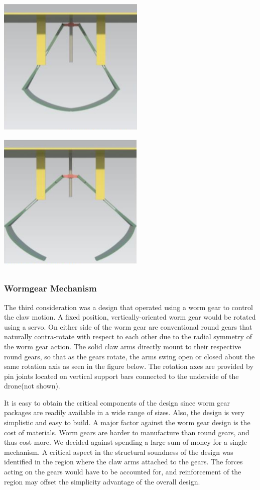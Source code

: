 			\includegraphics[width = 7cm, height = 7cm]{img/PL/slide2.PNG}
			\includegraphics[width = 7cm, height = 7cm]{img/PL/slide1.PNG}

		\subsubsection{Wormgear Mechanism}
			The third consideration was a design that operated using a worm gear to control the claw motion. A fixed position, vertically-oriented worm gear would be rotated using a servo. On either side of the worm gear are conventional round gears that naturally contra-rotate with respect to each other due to the radial symmetry of the worm gear action. The solid claw arms directly mount to their respective round gears, so that as the gears rotate, the arms swing open or closed about the same rotation axis as seen in the figure below. The rotation axes are provided by pin joints located on vertical support bars connected to the underside of the drone(not shown).

			It is easy to obtain the critical components of the design since worm gear packages are readily available in a wide range of sizes. Also, the design is very simplistic and easy to build. A major factor against the worm gear design is the cost of materials. Worm gears are harder to manufacture than round gears, and thus cost more. We decided against spending a large sum of money for a single mechanism. A critical aspect in the structural soundness of the design was identified in the region where the claw arms attached to the gears. The forces acting on the gears would have to be accounted for, and reinforcement of the region may offset the simplicity advantage of the overall design.
			

